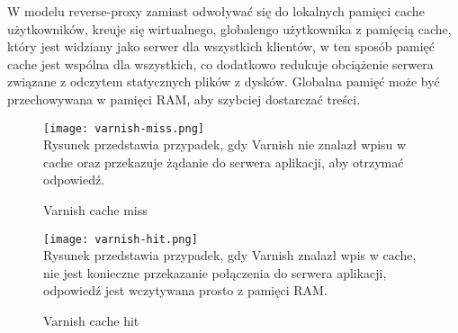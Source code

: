 W modelu reverse-proxy zamiast odwoływać się do lokalnych pamięci cache użytkowników, kreuje się wirtualnego, globalengo użytkownika z pamięcią cache, który jest widziany jako serwer dla wszystkich klientów, w ten sposób pamięć cache jest wspólna dla wszystkich, co dodatkowo redukuje obciążenie serwera związane z odczytem statycznych plików z dysków. Globalna pamięć może być przechowywana w pamięci RAM, aby szybciej dostarczać treści.

\begin{figure}[H]
  \caption[Varnish cache miss]{Varnish cache miss}
  \centering
    \texttt{[image: varnish-miss.png]} \\
    Rysunek przedstawia przypadek, gdy Varnish nie znalazł wpisu w cache oraz przekazuje żądanie do serwera aplikacji, aby otrzymać odpowiedź.
\end{figure}

\begin{figure}[H]
  \caption[Varnish cache hit]{Varnish cache hit}
  \centering
    \texttt{[image: varnish-hit.png]} \\
    Rysunek przedstawia przypadek, gdy Varnish znalazł wpis w cache, nie jest konieczne przekazanie połączenia do serwera aplikacji, odpowiedź jest wczytywana prosto z pamięci RAM.
\end{figure}
